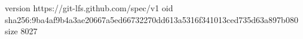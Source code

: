 version https://git-lfs.github.com/spec/v1
oid sha256:9ba4af9b4a3ae20667a5ed66732270dd613a5316f341013ced735d63a897b080
size 8027
